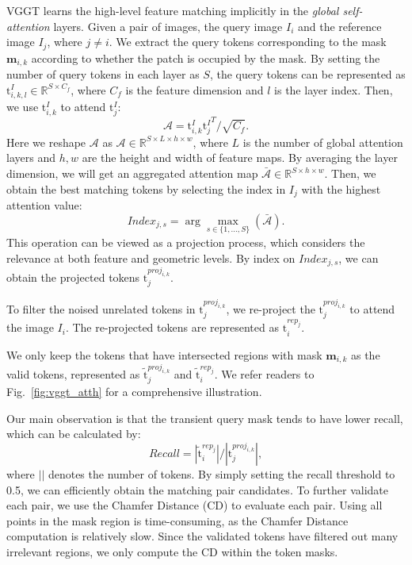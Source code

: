 \documentclass[letterpaper, 10 pt, conference]{ieeeconf}  %
\newcommand{\tok}{\mathrm{t}}
\begin{document}
VGGT learns the high-level feature matching implicitly in the \textit{global self-attention} layers. Given a pair of images, the query image $I_i$ and the reference image $I_j$, where $j \neq i$. We extract the query tokens corresponding to the mask $\bm{m}_{i, k}$ according to whether the patch is occupied by the mask. By setting the number of query tokens in each layer as $S$, the query tokens can be represented as $\tok^I_{i, k, l} \in \mathbb{R}^{S\times C_f}$, where $C_f$ is the feature dimension and $l$ is the layer index. Then, we use $\tok^I_{i, k}$ to attend $\tok^I_j$:
\begin{equation}
    \mathcal{A} = \tok^I_{i, k} {\tok^I_j}^T / \sqrt{C_f}.
\end{equation}
Here we reshape $\mathcal{A}$ as $\mathcal{A} \in \mathbb{R}^{S \times L \times h \times w}$, where $L$ is the number of global attention layers and $h, w$ are the height and width of feature maps. By averaging the layer dimension, we will get an aggregated attention map $\bar{\mathcal{A}} \in \mathbb{R}^{S \times h \times w}$. Then, we obtain the best matching tokens by selecting the index in $I_j$  with the highest attention value:
\begin{equation}
    Index_{j, s} = \arg \max_{s\in\{1, ..., S\}}(\bar{\mathcal{A}}).
\end{equation}
This operation can be viewed as a projection process, which considers the relevance at both feature and geometric levels. By index on $Index_{j, s}$, we can obtain the projected tokens $\tok^{proj_{i,k}}_{j}$.

To filter the noised unrelated tokens in $\tok^{proj_{i,k}}_{j}$, we re-project the $\tok^{proj_{i,k}}_{j}$ to attend the image $I_i$.
The re-projected tokens are represented as $\tok^{rep_{j}}_{i}$. 

We only keep the tokens that have intersected regions with mask $\textbf{m}_{i,k}$ as the valid tokens, represented as $\tilde{{\tok}}^{proj_{i,k}}_{j}$ and $\tilde{\tok}^{rep_{j}}_{i}$. We refer readers to Fig.~\ref{fig:vggt_atth} for a comprehensive illustration.

Our main observation is that the transient query mask tends to have lower recall, which can be calculated by:
\begin{equation}
    Recall = |\tilde{\tok}^{rep_{j}}_{i}| / |\tok^{proj_{i,k}}_{j}|,
\end{equation} 
where $||$ denotes the number of tokens. By simply setting the recall threshold to 0.5, we can efficiently obtain the matching pair candidates. To further validate each pair, we use the Chamfer Distance (CD) to evaluate each pair. Using all points in the mask region is time-consuming, as the Chamfer Distance computation is relatively slow. Since the validated tokens have filtered out many irrelevant regions, we only compute the CD within the token masks. 
\end{document}
